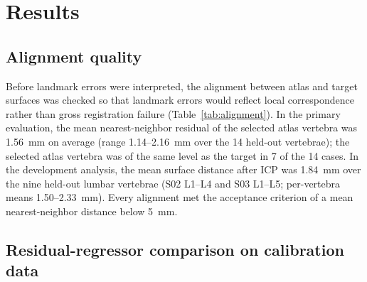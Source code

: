 \documentclass[5p,times,twocolumn,authoryear]{elsarticle}
\begin{document}
\section{Results}
\label{sec:results}

\subsection{Alignment quality}

Before landmark errors were interpreted, the alignment between atlas and target surfaces was checked so that landmark errors would reflect local correspondence rather than gross registration failure (Table~\ref{tab:alignment}). In the primary evaluation, the mean nearest-neighbor residual of the selected atlas vertebra was 1.56~mm on average (range 1.14--2.16~mm over the 14 held-out vertebrae); the selected atlas vertebra was of the same level as the target in 7 of the 14 cases. In the development analysis, the mean surface distance after ICP was 1.84~mm over the nine held-out lumbar vertebrae (S02 L1--L4 and S03 L1--L5; per-vertebra means 1.50--2.33~mm). Every alignment met the acceptance criterion of a mean nearest-neighbor distance below 5~mm.

\begin{table}[!t]
\centering
\caption{Alignment quality after atlas-to-target ICP (mean nearest-neighbor surface distance).}
\label{tab:alignment}
\renewcommand{\arraystretch}{1.15}
\small
{}
\end{table}

\subsection{Residual-regressor comparison on calibration data}
\end{document}
